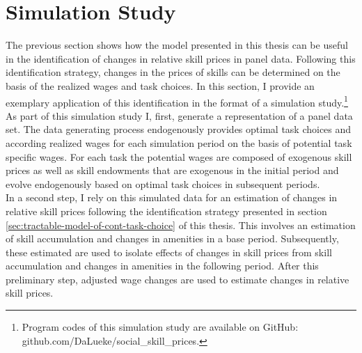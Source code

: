 \documentclass[../main.tex]{subfiles}
\begin{document}
\section{Simulation Study}\label{sec:simulation_study}
The previous section shows how the model presented in this thesis can be useful in the identification of changes in relative skill prices in panel data. Following this identification strategy, changes in the prices of skills can be determined on the basis of the realized wages and task choices. In this section, I provide an exemplary application of this identification in the format of a simulation study.\footnote{Program codes of this simulation study are available on GitHub: github.com/DaLueke/social\_skill\_prices.}
\\
As part of this simulation study I, first, generate a representation of a panel data set. The data generating process endogenously provides optimal task choices and according realized wages for each simulation period on the basis of potential task specific wages. For each task the potential wages are composed of exogenous skill prices as well as  skill endowments that are exogenous in the initial period and evolve endogenously based on optimal task choices in subsequent periods.
\\
In a second step, I rely on this simulated data for an estimation of changes in relative skill prices following the identification strategy presented in section \ref{sec:tractable-model-of-cont-task-choice} of this thesis. This involves an estimation of skill accumulation and changes in amenities in a base period. Subsequently, these estimated are used to isolate effects of changes in skill prices from skill accumulation and changes in amenities in the following period. After this preliminary step, adjusted wage changes are used to estimate changes in relative skill prices.
\end{document}
